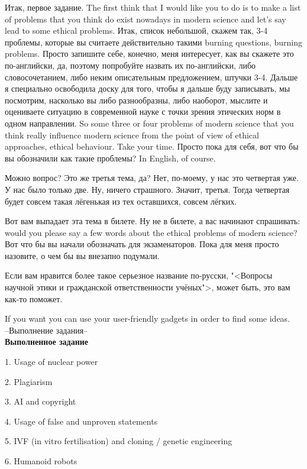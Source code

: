 \documentclass[main.tex]{subfiles}
\begin{document}
Итак, первое задание.
The first think that I would like you to do is to make a list of problems that you think do exist nowadays in modern science and let's say lead to some ethical problems.
Итак, список небольшой, скажем так, 3-4 проблемы, которые вы считаете действительно такими burning questions, burning problems.
Просто запишите себе, конечно, меня интересует, как вы скажете это по-английски, да, поэтому попробуйте назвать их по-английски, либо словосочетанием, либо неким описательным предложением, штучки 3-4.
Дальше я специально освободила доску для того, чтобы я дальше буду записывать, мы посмотрим, насколько вы либо разнообразны, либо наоборот, мыслите и оцениваете ситуацию в современной науке с точки зрения этических норм в одном направлении.
So some three or four problems of modern science that you think really influence modern science from the point of view of ethical approaches, ethical behaviour.
Take your time.
Просто пока для себя, вот что бы вы обозначили как такие проблемы?
In English, of course.

Можно вопрос? Это же третья тема, да? Нет, по-моему, у нас это четвертая уже.
У нас было только две.
Ну, ничего страшного.
Значит, третья.
Тогда четвертая будет совсем такая лёгенькая из тех оставшихся, совсем лёгких.

Вот вам выпадает эта тема в билете.
Ну не в билете, а вас начинают спрашивать: would you please say a few words about the ethical problems of modern science?
Вот что бы вы начали обозначать для экзаменаторов.
Пока для меня просто назовите, о чем бы вы внезапно подумали.

Если вам нравится более такое серьезное название по-русски, "<Вопросы научной этики и гражданской ответственности учёных">, может быть, это вам как-то поможет.

If you want you can use your user-friendly gadgets in order to find some ideas.
\\

--Выполнение задания--
\\

\textbf{Выполненное задание}

1. Usage of nuclear power

2. Plagiarism

3. AI and copyright

4. Usage of false and unproven statements

5. IVF (in vitro fertilisation) and cloning / genetic engineering

6. Humanoid robots
\end{document}
